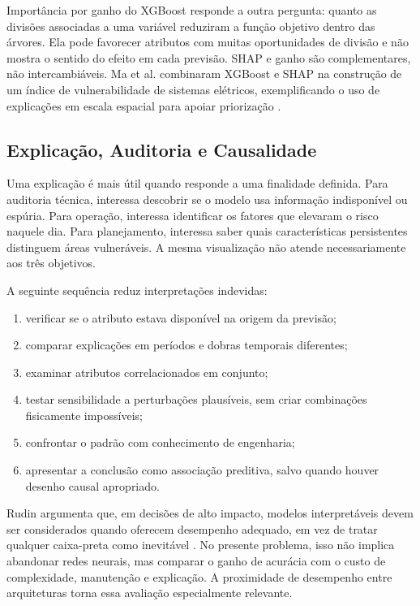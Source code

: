 Importância por ganho do XGBoost responde a outra pergunta: quanto as divisões associadas a uma variável reduziram a função objetivo dentro das árvores. Ela pode favorecer atributos com muitas oportunidades de divisão e não mostra o sentido do efeito em cada previsão. SHAP e ganho são complementares, não intercambiáveis. Ma et al. combinaram XGBoost e SHAP na construção de um índice de vulnerabilidade de sistemas elétricos, exemplificando o uso de explicações em escala espacial para apoiar priorização \cite{ma2025vulnerability}.

\subsection{Explicação, Auditoria e Causalidade}

Uma explicação é mais útil quando responde a uma finalidade definida. Para auditoria técnica, interessa descobrir se o modelo usa informação indisponível ou espúria. Para operação, interessa identificar os fatores que elevaram o risco naquele dia. Para planejamento, interessa saber quais características persistentes distinguem áreas vulneráveis. A mesma visualização não atende necessariamente aos três objetivos.

A seguinte sequência reduz interpretações indevidas:
\begin{enumerate}
    \item verificar se o atributo estava disponível na origem da previsão;
    \item comparar explicações em períodos e dobras temporais diferentes;
    \item examinar atributos correlacionados em conjunto;
    \item testar sensibilidade a perturbações plausíveis, sem criar combinações fisicamente impossíveis;
    \item confrontar o padrão com conhecimento de engenharia;
    \item apresentar a conclusão como associação preditiva, salvo quando houver desenho causal apropriado.
\end{enumerate}

Rudin argumenta que, em decisões de alto impacto, modelos interpretáveis devem ser considerados quando oferecem desempenho adequado, em vez de tratar qualquer caixa-preta como inevitável \cite{rudin2019stop}. No presente problema, isso não implica abandonar redes neurais, mas comparar o ganho de acurácia com o custo de complexidade, manutenção e explicação. A proximidade de desempenho entre arquiteturas torna essa avaliação especialmente relevante.

